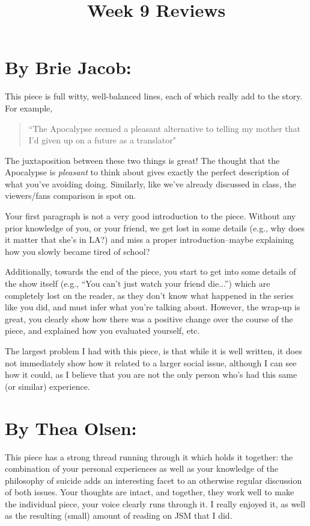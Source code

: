 \documentclass[letterpaper]{article}
\title{Week 9 Reviews}
\date{}
\begin{document}
    \maketitle
    \onehalfspacing
    \section{By Brie Jacob:}
    This piece is full witty, well-balanced lines, each of which really add to the story. For example,
    \begin{quote}
    ``The Apocalypse seemed a pleasant alternative to telling my mother that I'd given up on a future as a translator"
    \end{quote}
    The juxtaposition between these two things is great! The thought that the Apocalypse is \emph{pleasant} to think about gives exactly the perfect description of what you've avoiding doing. Similarly, like we've already discussed in class, the viewers/fans comparison is spot on.

    Your first paragraph is not a very good introduction to the piece. Without any prior knowledge of you, or your friend, we get lost in some details (e.g., why does it matter that she's in LA?) and miss a proper introduction--maybe explaining how you slowly became tired of school?
   
    Additionally, towards the end of the piece, you start to get into some details of the show itself (e.g., ``You can't just watch your friend die...'') which are completely lost on the reader, as they don't know what happened in the series like you did, and must infer what you're talking about. However, the wrap-up is great, you clearly show how there was a positive change over the course of the piece, and explained how you evaluated yourself, etc.

    The largest problem I had with this piece, is that while it is well written, it does not immediately show how it related to a larger social issue, although I can see how it could, as I believe that you are not the only person who's had this same (or similar) experience.

    \section{By Thea Olsen:}
    This piece has a strong thread running through it which holds it together: the combination of your personal experiences as well as your knowledge of the philosophy of suicide adds an interesting facet to an otherwise regular discussion of both issues. Your thoughts are intact, and together, they work well to make the individual piece, your voice clearly runs through it. I really enjoyed it, as well as the resulting (small) amount of reading on JSM that I did.
\end{document}
